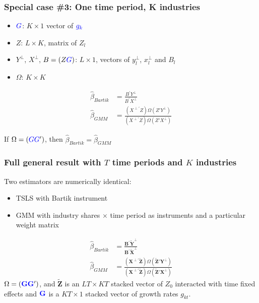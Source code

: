\documentclass[notes,11pt, aspectratio=169]{beamer}
\begin{document}
\begin{frame}[label=kindustries]
\frametitle{Special case \#3: One time period, K industries}

\begin{itemize}
	\setlength\itemsep{1em}
\item $\textcolor{blue}{G}$: $K \times 1$ vector of $\textcolor{blue}{g_k}$
\item $Z$: $L \times K$, matrix of $Z_l$
\item $Y^\perp$, $X^\perp$, $B = (Z \textcolor{blue}{G})$: $L \times 1$, vectors of $y_l^\perp$, $x_l^\perp$ and $B_l$
\item $\Omega$: $K\times K$
\end{itemize}



\begin{align*}
  \hat{\beta}_{Bartik} &= \frac{B^\prime  Y^\perp}{B^\prime X^\perp}\\
  \hat{\beta}_{GMM} &= \frac{(X^{\perp \prime}Z)\Omega (Z'Y^\perp)}{(X^{\perp \prime} Z)\Omega (Z'X^\perp)}
\end{align*} 

 If $\Omega = (\textcolor{blue}{G} \textcolor{blue}{G}^\prime)$, then $\hat{\beta}_{Bartik}=\hat{\beta}_{GMM}$   

\end{frame}

\begin{frame}
\frametitle{Full general result with $T$ time periods and $K$ industries}

Two estimators are numerically identical:
\begin{itemize}
\item TSLS with Bartik instrument
\item GMM with industry shares $\times$ time period as instruments and a particular weight matrix 
\end{itemize}
\begin{align*}
  \hat{\beta}_{Bartik} &= \frac{\mathbf{B}^\prime  \widetilde{\mathbf{Y}}^\perp}{\mathbf{B}^\prime \widetilde{\mathbf{X}}^\perp}\\
  \hat{\beta}_{GMM} &= \frac{(\mathbf{X}^{\perp \prime}\widetilde{\mathbf{Z}})\Omega (\widetilde{\mathbf{Z}}'\mathbf{Y}^\perp)}{(\mathbf{X}^{\perp \prime} \widetilde{\mathbf{Z}})\Omega (\widetilde{\mathbf{Z}}'\mathbf{X}^\perp)}
\end{align*} 
$\Omega = (\textcolor{blue}{\mathbf{G}}
\textcolor{blue}{\mathbf{G}}^\prime)$, and $\widetilde{\mathbf{Z}}$ is
an $LT \times KT$ stacked vector of $Z_{0}$ interacted with time fixed
effects and $\textcolor{blue}{\mathbf{G}}$ is a $KT \times 1$ stacked
vector of growth rates $g_{kt}$.

\end{frame}
\end{document}
